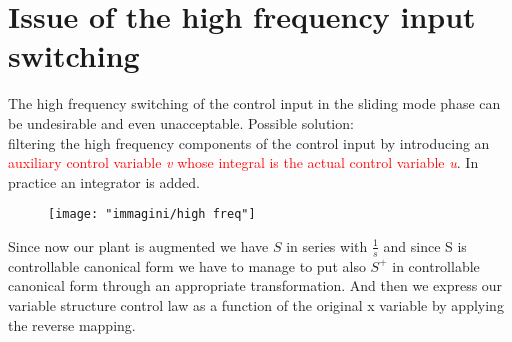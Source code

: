 \section{Issue of the high frequency input switching}
The high frequency switching of the control input in the sliding mode phase can be undesirable and even unacceptable.
Possible solution:\\
filtering the high frequency components of the control input by introducing an \textcolor{red}{auxiliary control variable \emph{v} whose integral is the actual control variable \emph{u}}. In practice an integrator is added.
\begin{figure}[H]
	\centering
	\texttt{[image: "immagini/high freq"]}
	\label{fig:high-freq}
	\caption{}
\end{figure}
Since now our plant is augmented we have $S$ in series with $\frac{1}{s}$ and since S is controllable canonical form we have to manage to put also $S^+$ in controllable canonical form through an appropriate transformation. And then we express our variable structure control law as a function of the original x variable by applying the reverse mapping.

